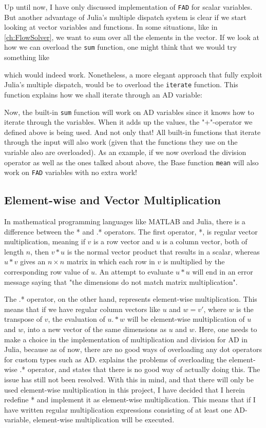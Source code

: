 Up until now, I have only discussed implementation of \texttt{FAD} for scalar variables. But another advantage of Julia's multiple dispatch system is clear if we start looking at vector variables and functions. In some situations, like in \autoref{ch:FlowSolver}, we want to sum over all the elements in the vector. If we look at how we can overload the \texttt{sum} function, one might think that we would try something like

which would indeed work. Nonetheless, a more elegant approach that fully exploit Julia's multiple dispatch, would be to overload the \texttt{iterate} function. This function explains how we shall iterate through an AD variable: 

Now, the built-in \texttt{sum} function will work on AD variables since it knows how to iterate through the variables. When it adds up the values, the "+"-operator we defined above is being used. And not only that! All built-in functions that iterate through the input will also work (given that the functions they use on the variable also are overloaded). As an example, if we now overload the division operator as well as the ones talked about above, the Base function \texttt{mean} will also work on \texttt{FAD} variables with no extra work!

\subsection{Element-wise and Vector Multiplication}
In mathematical programming languages like MATLAB and Julia, there is a difference between the * and .* operators. The first operator, *, is regular vector multiplication, meaning if $v$ is a row vector and $u$ is a column vector, both of length $n$, then $v*u$ is the normal vector product that results in a scalar, whereas $u*v$ gives an $n\times n$ matrix in which each row in $v$ is multiplied by the corresponding row value of $u$. An attempt to evaluate $u*u$ will end in an error message saying that "the dimensions do not match matrix multiplication". 

The .* operator, on the other hand, represents element-wise multiplication. This means that if we have regular column vectors like $u$ and $w = v'$, where $w$ is the transpose of $v$, the evaluation of $u.*w$ will be element-wise multiplication of $u$ and $w$, into a new vector of the same dimensions as $u$ and $w$. Here, one needs to make a choice in the implementation of multiplication and division for AD in Julia, because as of now, there are no good ways of overloading any dot operators for custom types such as AD. \emph{\citet{JuliaIssueDot}} explains the problems of overloading the element-wise .* operator, and states that there is no good way of actually doing this. The issue has still not been resolved. With this in mind, and that there will only be used element-wise multiplication in this project, I have decided that I herein redefine * and implement it as element-wise multiplication. This means that if I have written regular multiplication expressions consisting of at least one AD-variable, element-wise multiplication will be executed.

